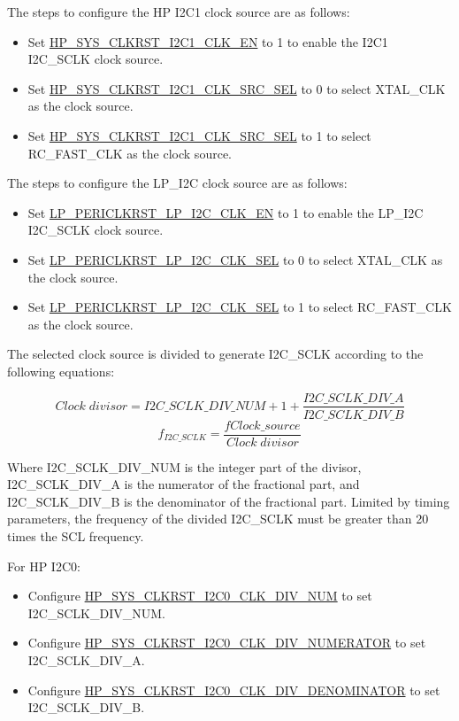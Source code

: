 \documentclass[main\_\_EN.tex]{subfiles}
\begin{document}
The steps to configure the HP I2C1 clock source are as follows:

\begin{itemize}
    \item Set \hyperref[fielddesc:HPSYSCLKRSTI2C1CLKEN]{HP\_SYS\_CLKRST\_I2C1\_CLK\_EN} to 1 to enable the I2C1 I2C\_SCLK clock source.
    \item Set \hyperref[fielddesc:HPSYSCLKRSTI2C1CLKSRCSEL]{HP\_SYS\_CLKRST\_I2C1\_CLK\_SRC\_SEL} to 0 to select XTAL\_CLK as the clock source.
    \item Set \hyperref[fielddesc:HPSYSCLKRSTI2C1CLKSRCSEL]{HP\_SYS\_CLKRST\_I2C1\_CLK\_SRC\_SEL} to 1 to select RC\_FAST\_CLK as the clock source.
\end{itemize}

The steps to configure the LP\_I2C clock source are as follows:

\begin{itemize}
    \item Set \hyperref[fielddesc:LPPERICLKRSTLPI2CCLKEN]{LP\_PERICLKRST\_LP\_I2C\_CLK\_EN} to 1 to enable the LP\_I2C I2C\_SCLK clock source.
    \item Set \hyperref[fielddesc:LPPERICLKRSTLPI2CCLKSEL]{LP\_PERICLKRST\_LP\_I2C\_CLK\_SEL} to 0 to select XTAL\_CLK as the clock source.
    \item Set \hyperref[fielddesc:LPPERICLKRSTLPI2CCLKSEL]{LP\_PERICLKRST\_LP\_I2C\_CLK\_SEL} to 1 to select RC\_FAST\_CLK as the clock source.
\end{itemize}

The selected clock source is divided to generate I2C\_SCLK according to the following equations:

    \[
        {Clock\;divisor} = I2C\_SCLK\_DIV\_NUM + 1+\frac{I2C\_SCLK\_DIV\_A}{I2C\_SCLK\_DIV\_B}
    \]
    \[
        f_{I2C\_SCLK}=\frac{fClock\_source_{}}{Clock\;divisor}
    \]

Where I2C\_SCLK\_DIV\_NUM is the integer part of the divisor, I2C\_SCLK\_DIV\_A is the numerator of the fractional part, and I2C\_SCLK\_DIV\_B is the denominator of the fractional part. Limited by timing parameters, the frequency of the divided I2C\_SCLK must be greater than 20 times the SCL frequency.

For HP I2C0:

\begin{itemize}
    \item Configure \hyperref[fielddesc:HPSYSCLKRSTI2C0CLKDIVNUM]{HP\_SYS\_CLKRST\_I2C0\_CLK\_DIV\_NUM} to set I2C\_SCLK\_DIV\_NUM.
    \item Configure \hyperref[fielddesc:HPSYSCLKRSTI2C0CLKDIVNUMERATOR]{HP\_SYS\_CLKRST\_I2C0\_CLK\_DIV\_NUMERATOR} to set I2C\_SCLK\_DIV\_A.
    \item Configure \hyperref[fielddesc:HPSYSCLKRSTI2C0CLKDIVDENOMINATOR]{HP\_SYS\_CLKRST\_I2C0\_CLK\_DIV\_DENOMINATOR} to set I2C\_SCLK\_DIV\_B.
\end{itemize}
\end{document}
